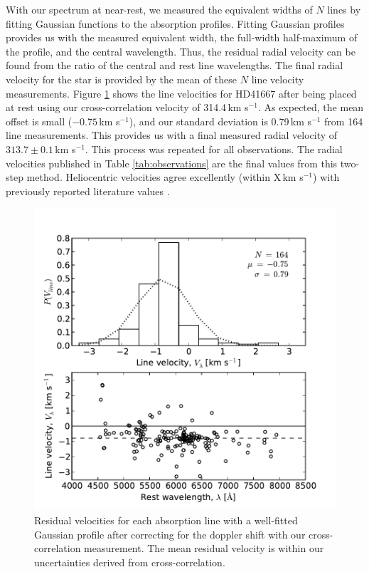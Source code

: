 \documentclass{emulateapj}
\begin{document}
With our spectrum at near-rest, we measured the equivalent widths of $N$ lines by fitting Gaussian functions to the absorption profiles. Fitting Gaussian profiles provides us with the measured equivalent width, the full-width half-maximum of the profile, and the central wavelength. Thus, the residual radial velocity can be found from the ratio of the central and rest line wavelengths. The final radial velocity for the star is provided by the mean of these $N$ line velocity measurements. Figure \ref{fig:line-velocities} shows the line velocities for HD41667 after  being placed at rest using our cross-correlation velocity of 314.4\,km s$^{-1}$. As expected, the mean offset is small ($-0.75$\,km s$^{-1}$), and our standard deviation is 0.79\,km s$^{-1}$ from 164 line measurements. This provides us with a final measured radial velocity of $313.7 \pm 0.1$\,km s$^{-1}$. This process was repeated for all observations. The radial velocities published in Table \ref{tab:observations} are the final values from this two-step method. Heliocentric velocities agree excellently (within X\,km s$^{-1}$) with previously reported literature values \citep{williams;et-al_2011,wylie-de-boer;et-al_2012}.

\begin{figure}[h]
	\includegraphics[width=\columnwidth]{./figures/line-velocity.pdf}
	\caption{Residual velocities for each absorption line with a well-fitted Gaussian profile after correcting for the doppler shift with our cross-correlation measurement. The mean residual velocity is within our uncertainties derived from cross-correlation.}
	\label{fig:line-velocities}
\end{figure}
\end{document}
